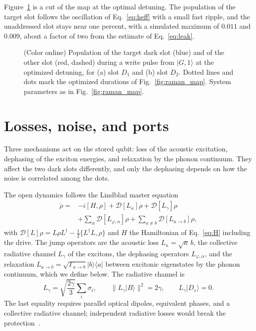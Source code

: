 \documentclass[aps,pra,preprint,groupedaddress,amsmath,amssymb,floatfix]{revtex4-2}
\newcommand{\ket}[1]{\lvert #1\rangle}
\newcommand{\bra}[1]{\langle #1\rvert}
\begin{document}
Figure~\ref{fig:raman_dyn} is a cut of the map at the optimal detuning. The population of the target slot follows the oscillation of Eq.~\eqref{eq:heff} with a small fast ripple, and the unaddressed slot stays near one percent, with a simulated maximum of $0.011$ and $0.009$, about a factor of two from the estimate of Eq.~\eqref{eq:leak}.

\begin{figure}[t]
\centering
\resizebox{\columnwidth}{!}{}
\caption{(Color online) Population of the target dark slot (blue) and of the other slot (red, dashed) during a write pulse from $\ket{G,1}$ at the optimized detuning, for (a) slot $D_1$ and (b) slot $D_2$. Dotted lines and dots mark the optimized durations of Fig.~\ref{fig:raman_map}. System parameters as in Fig.~\ref{fig:raman_map}.}
\label{fig:raman_dyn}
\end{figure}

\section{Losses, noise, and ports}
\label{sec:noise}

Three mechanisms act on the stored qubit: loss of the acoustic excitation, dephasing of the exciton energies, and relaxation by the phonon continuum. They affect the two dark slots differently, and only the dephasing depends on how the noise is correlated among the dots.

The open dynamics follows the Lindblad master equation
\begin{equation}
\begin{aligned}\dot\rho={}&-i[H,\rho]+\mathcal D[L_\kappa]\rho+\mathcal D[L_\gamma]\rho\\&+\sum_\alpha\mathcal D[L_{\varphi,\alpha}]\rho+\sum_{a\neq b}\mathcal D[L_{a\to b}]\rho,\end{aligned}\label{eq:master}
\end{equation}
with $\mathcal D[L]\rho=L\rho L^\dagger-\tfrac12\{L^\dagger L,\rho\}$ and $H$ the Hamiltonian of Eq.~\eqref{eq:H} including the drive. The jump operators are the acoustic loss $L_\kappa=\sqrt\kappa\,b$, the collective radiative channel $L_\gamma$ of the excitons, the dephasing operators $L_{\varphi,\alpha}$, and the relaxation $L_{a\to b}=\sqrt{\Gamma_{a\to b}}\ket b\bra a$ between excitonic eigenstates by the phonon continuum, which we define below. The radiative channel is
\begin{equation}
L_\gamma=\sqrt{\frac{2\gamma}{3}}\sum_i\sigma_i,\qquad \|L_\gamma\ket B\|^2=2\gamma,\qquad L_\gamma\ket{D_s}=0.\label{eq:radiative}
\end{equation}
The last equality requires parallel optical dipoles, equivalent phases, and a collective radiative channel; independent radiative losses would break the protection~\cite{dicke1954,mokhlespour2012,carlson2019}.
\end{document}

